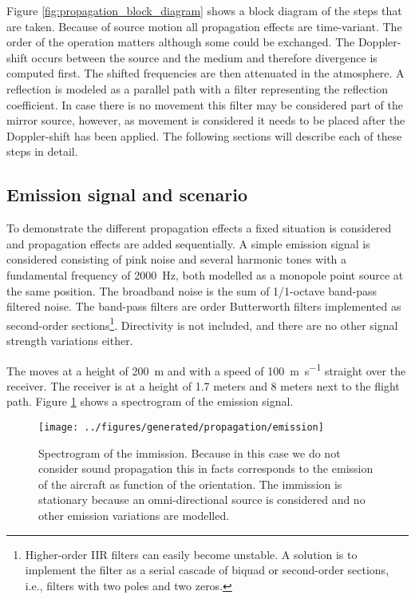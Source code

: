 Figure \ref{fig:propagation_block_diagram} shows a block diagram of the steps
that are taken. Because of source motion all propagation effects are
time-variant. The order of the operation matters although some could be
exchanged. The Doppler-shift occurs between the source and the medium and
therefore divergence is computed first. The shifted frequencies are then
attenuated in the atmosphere. A reflection is modeled as a parallel path with a
filter representing the reflection coefficient. In case there is no movement
this filter may be considered part of the mirror source, however, as movement is
considered it needs to be placed after the Doppler-shift has been applied. The
following sections will describe each of these steps in detail.

\subsection{Emission signal and scenario}
To demonstrate the different propagation effects a fixed situation is considered
and propagation effects are added sequentially. A simple emission signal is
considered consisting of pink noise and several harmonic tones with a
fundamental frequency of \SI{2000}{\hertz}, both modelled as a monopole point
source at the same position. The broadband noise is the sum of 1/1-octave
band-pass filtered noise. The band-pass filters are  order Butterworth
filters implemented as second-order sections\footnote{
Higher-order IIR filters can easily become unstable. A solution is to implement
the filter as a serial cascade of biquad or second-order sections, i.e., filters
with two poles and two zeros.}. Directivity is not included, and
there are no other signal strength variations either.

The  moves at a height of \SI{200}{\meter} and with a
speed of \SI{100}{\meter\per\second} straight over the receiver.
The receiver is at a height of 1.7 meters and 8 meters next to the flight path.
Figure \ref{fig:implementation:propagation:emission} shows a spectrogram of the
emission signal.


\begin{figure}[H]
  \centering
  \texttt{[image: ../figures/generated/propagation/emission]}
  \caption{Spectrogram of the immission. Because in this case we do not consider sound propagation this in facts corresponds to the emission of the aircraft as function of the orientation. The immission is stationary because an omni-directional source is considered and no other emission variations are modelled.}
  \label{fig:implementation:propagation:emission}
\end{figure}


